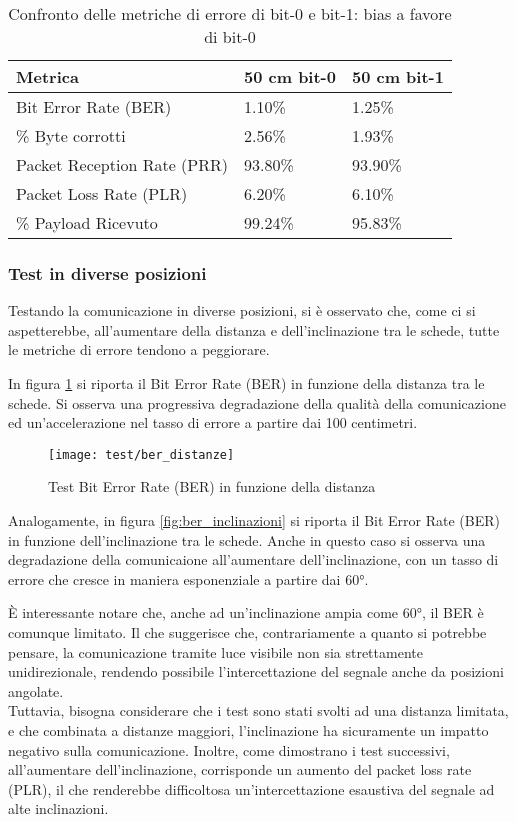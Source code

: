 \begin{table}[H]
    \caption{Confronto delle metriche di errore di bit-0 e bit-1: bias a favore di bit-0}
    \label{tab:bit-bias}
    \begin{tabularx}{\textwidth}{Xll}
        \hline
        \textbf{Metrica} & \textbf{50 cm bit-0} & \textbf{50 cm bit-1}\\
        \hline
        Bit Error Rate (BER)            & 1.10\%  & 1.25\% \\
        \hline
        \% Byte corrotti                & 2.56\%  & 1.93\% \\
        \hline
        Packet Reception Rate (PRR)     & 93.80\% & 93.90\% \\
        \hline
        Packet Loss Rate (PLR)          & 6.20\%  & 6.10\% \\
        \hline
        \% Payload Ricevuto             & 99.24\% & 95.83\% \\
        \hline
    \end{tabularx}
\end{table}

\subsubsection{Test in diverse posizioni}
Testando la comunicazione in diverse posizioni, si è osservato che, come ci si aspetterebbe, all'aumentare della distanza e dell'inclinazione tra le schede, tutte le metriche di errore tendono a peggiorare.

In figura \ref{fig:ber_distanze} si riporta il Bit Error Rate (BER) in funzione della distanza tra le schede. Si osserva una progressiva degradazione della qualità della comunicazione ed un'accelerazione nel tasso di errore a partire dai 100 centimetri.

\begin{figure}[H] 
    \centering 
    \texttt{[image: test/ber\_distanze]} 
    \caption{Test Bit Error Rate (BER) in funzione della distanza}
    \label{fig:ber_distanze}
\end{figure}

Analogamente, in figura \ref{fig:ber_inclinazioni} si riporta il Bit Error Rate (BER) in funzione dell'inclinazione tra le schede. Anche in questo caso si osserva una degradazione della comunicaione all'aumentare dell'inclinazione, con un tasso di errore che cresce in maniera esponenziale a partire dai 60°.

È interessante notare che, anche ad un'inclinazione ampia come 60°, il BER è comunque limitato. Il che suggerisce che, contrariamente a quanto si potrebbe pensare, la comunicazione tramite luce visibile non sia strettamente unidirezionale, rendendo possibile l'intercettazione del segnale anche da posizioni angolate.\\
Tuttavia, bisogna considerare che i test sono stati svolti ad una distanza limitata, e che combinata a distanze maggiori, l'inclinazione ha sicuramente un impatto negativo sulla comunicazione. Inoltre, come dimostrano i test successivi, all'aumentare dell'inclinazione, corrisponde un aumento del packet loss rate (PLR), il che renderebbe difficoltosa un'intercettazione esaustiva del segnale ad alte inclinazioni.

